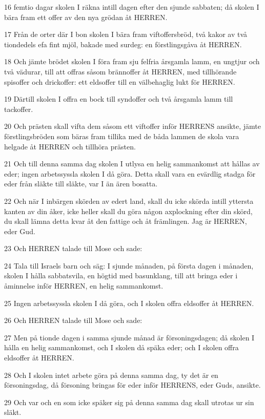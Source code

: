 \par 16 femtio dagar skolen I räkna intill dagen efter den sjunde sabbaten; då skolen I bära fram ett offer av den nya grödan åt HERREN.
\par 17 Från de orter där I bon skolen I bära fram viftoffersbröd, två kakor av två tiondedels efa fint mjöl, bakade med surdeg: en förstlingsgåva åt HERREN.
\par 18 Och jämte brödet skolen I föra fram sju felfria årsgamla lamm, en ungtjur och två vädurar, till att offras såsom brännoffer åt HERREN, med tillhörande spisoffer och drickoffer: ett eldsoffer till en välbehaglig lukt för HERREN.
\par 19 Därtill skolen I offra en bock till syndoffer och två årsgamla lamm till tackoffer.
\par 20 Och prästen skall vifta dem såsom ett viftoffer inför HERRENS ansikte, jämte förstlingsbröden som bäras fram tillika med de båda lammen de skola vara helgade åt HERREN och tillhöra prästen.
\par 21 Och till denna samma dag skolen I utlysa en helig sammankomst att hållas av eder; ingen arbetssyssla skolen I då göra. Detta skall vara en evärdlig stadga för eder från släkte till släkte, var I än ären bosatta.
\par 22 Och när I inbärgen skörden av edert land, skall du icke skörda intill yttersta kanten av din åker, icke heller skall du göra någon axplockning efter din skörd, du skall lämna detta kvar åt den fattige och åt främlingen. Jag är HERREN, eder Gud.
\par 23 Och HERREN talade till Mose och sade:
\par 24 Tala till Israels barn och säg: I sjunde månaden, på första dagen i månaden, skolen I hålla sabbatsvila, en högtid med basunklang, till att bringa eder i åminnelse inför HERREN, en helig sammankomst.
\par 25 Ingen arbetssyssla skolen I då göra, och I skolen offra eldsoffer åt HERREN.
\par 26 Och HERREN talade till Mose och sade:
\par 27 Men på tionde dagen i samma sjunde månad är försoningsdagen; då skolen I hålla en helig sammankomst, och I skolen då späka eder; och I skolen offra eldsoffer åt HERREN.
\par 28 Och I skolen intet arbete göra på denna samma dag, ty det är en försoningsdag, då försoning bringas för eder inför HERRENS, eder Guds, ansikte.
\par 29 Och var och en som icke späker sig på denna samma dag skall utrotas ur sin släkt.
